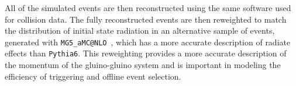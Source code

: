 All of the simulated events are then reconstructed using the same software used for collision data.
The fully reconstructed events are then reweighted to match the distribution of initial state radiation in an alternative sample of events, 
generated with \texttt{MG5\_aMC@NLO}~\cite{madgraph}, which has a more accurate description of radiate effects than \texttt{Pythia6}.
This reweighting provides a more accurate description of the momentum of the gluino-gluino system and is important in modeling the efficiency of triggering and offline event selection.


